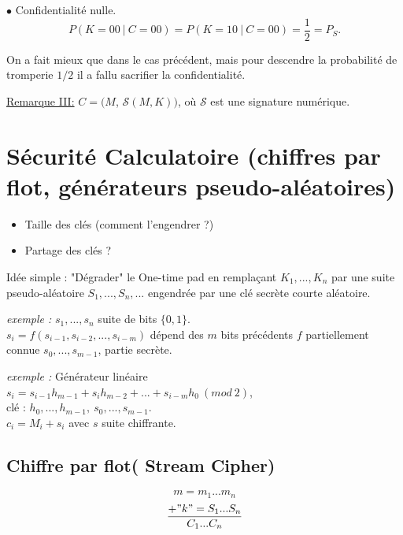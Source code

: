 \documentclass[12pt,a4paper]{article}
\begin{document}
$\bullet$ Confidentialité nulle.\\

$$P(K=00\ \vert \ C=00) = P(K=10\ \vert \ C=00) = \frac{1}{2} = P_S.$$

On a fait mieux que dans le cas précédent, mais pour descendre la probabilité de tromperie $1/2$ il a fallu sacrifier la confidentialité.

\bigskip

\underline{Remarque III:} $C=(M$, $\mathcal{S}(M,K))$, où $\mathcal{S}$ est une signature numérique.

\section{Sécurité Calculatoire (chiffres par flot, générateurs pseudo-aléatoires)}
\begin{itemize}
\item Taille des clés (comment l'engendrer ?)
\item Partage des clés ?
\end{itemize}

\bigskip
Idée simple : "Dégrader" le One-time pad en remplaçant $K_1,...,K_n$ par une suite pseudo-aléatoire $S_1,...,S_n,...$ engendrée par une clé secrète courte aléatoire.

\bigskip

\textit{exemple : }$s_1,...,s_n$ suite de bits $\{0,1\}$.\\
$s_i=f(s_{i-1}, s_{i-2},...,s_{i-m})$ dépend des $m$ bits précédents $f$ partiellement connue $s_0,...,s_{m-1}$, partie secrète.

\bigskip

\textit{exemple : }Générateur linéaire\\
$s_i=s_{i-1}h_{m-1}+s_i h_{m-2}+ ... + s_{i-m}h_0 \ (mod \ 2)$,\\
clé : $h_0,...,h_{m-1}, \ s_0,...,s_{m-1}$.\\
$c_i=M_i+s_i$ avec $s$ suite chiffrante.

\subsection{Chiffre par flot( Stream Cipher)}

\begin{displaymath}
m = m_1 ...m_n
\end{displaymath}
\begin{displaymath}
\frac{+ "k" = S_1 ...S_n}{C_1 ... C_n }
\end{displaymath}
\end{document}
